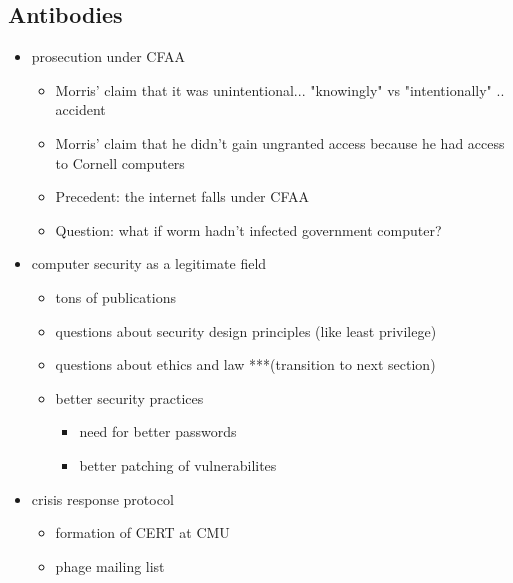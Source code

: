 \subsection*{Antibodies}
	\begin{itemize}
	\item prosecution under CFAA
    	\begin{itemize}
    	\item Morris' claim that it was unintentional... "knowingly" vs "intentionally"	.. accident
    	\item Morris' claim that he didn't gain ungranted access because he had access to Cornell computers
    	\item Precedent: the internet falls under CFAA
        \item Question: what if worm hadn't infected government computer?
    	\end{itemize}
	\item computer security as a legitimate field
        	\begin{itemize}
        	\item tons of publications
            \item questions about security design principles (like least privilege)
            \item questions about ethics and law ***(transition to next section)
			\item better security practices 
				\begin{itemize}
				\item need for better passwords
				\item better patching of vulnerabilites
        	    \end{itemize}
        	\end{itemize}
    \item crisis response protocol
    	\begin{itemize}
    	\item formation of CERT at CMU
    	\item phage mailing list
    	\end{itemize}
    \end{itemize}